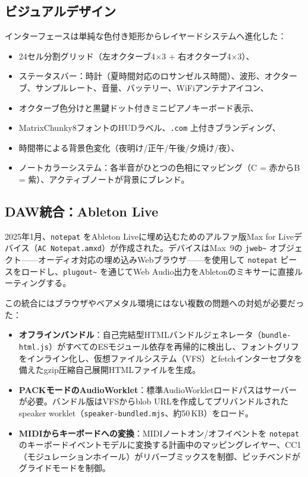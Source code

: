 \documentclass[10pt,letterpaper,twocolumn]{article}
\begin{document}
\subsection{ビジュアルデザイン}

インターフェースは単純な色付き矩形からレイヤードシステムへ進化した：

\begin{itemize}
  \item 24セル分割グリッド（左オクターブ4$\times$3 + 右オクターブ4$\times$3）、
  \item ステータスバー：時計（夏時間対応のロサンゼルス時間）、波形、オクターブ、サンプルレート、音量、バッテリー、WiFiアンテナアイコン、
  \item オクターブ色分けと黒鍵ドット付きミニピアノキーボード表示、
  \item MatrixChunky8フォントのHUDラベル、\texttt{.com} 上付きブランディング、
  \item 時間帯による背景色変化（夜明け/正午/午後/夕焼け/夜）、
  \item ノートカラーシステム：各半音がひとつの色相にマッピング（C = 赤からB = 紫）、アクティブノートが背景にブレンド。
\end{itemize}

\subsection{DAW統合：Ableton Live}

2025年1月、\texttt{notepat} をAbleton Liveに埋め込むためのアルファ版Max for Liveデバイス（\texttt{AC Notepat.amxd}）が作成された。デバイスはMax~9の \texttt{jweb\textasciitilde} オブジェクト——オーディオ対応の埋め込みWebブラウザ——を使用して \texttt{notepat} ピースをロードし、\texttt{plugout\textasciitilde} を通じてWeb Audio出力をAbletonのミキサーに直接ルーティングする。

この統合にはブラウザやベアメタル環境にはない複数の問題への対処が必要だった：

\begin{itemize}
  \item \textbf{オフラインバンドル}：自己完結型HTMLバンドルジェネレータ（\texttt{bundle-html.js}）がすべてのESモジュール依存を再帰的に検出し、フォントグリフをインライン化し、仮想ファイルシステム（VFS）とfetchインターセプタを備えたgzip圧縮自己展開HTMLファイルを生成。
  \item \textbf{PACKモードのAudioWorklet}：標準AudioWorkletロードパスはサーバーが必要。バンドル版はVFSからblob URLを作成してプリバンドルされたspeaker worklet（\texttt{speaker-bundled.mjs}、約50\,KB）をロード。
  \item \textbf{MIDIからキーボードへの変換}：MIDIノートオン/オフイベントを \texttt{notepat} のキーボードイベントモデルに変換する計画中のマッピングレイヤー、CC1（モジュレーションホイール）がリバーブミックスを制御、ピッチベンドがグライドモードを制御。
\end{itemize}
\end{document}
